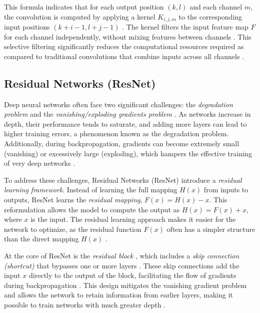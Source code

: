 This formula indicates that for each output position \( (k, l) \) and each channel \( m \), the convolution is computed by applying a kernel \( K_{i,j,m} \) to the corresponding input positions \( (k+i-1, l+j-1) \) \cite{howard2017mobilenetsefficientconvolutionalneural}. The kernel filters the input feature map \( F \) for each channel independently, without mixing features between channels \cite{howard2017mobilenetsefficientconvolutionalneural}. This selective filtering significantly reduces the computational resources required as compared to traditional convolutions that combine inputs across all channels \cite{howard2017mobilenetsefficientconvolutionalneural}.





\subsection{Residual Networks (ResNet)}
Deep neural networks often face two significant challenges: the \textit{degradation problem} and the \textit{vanishing/exploding gradients problem} \cite{he2015deepresiduallearningimage}. As networks increase in depth, their performance tends to saturate, and adding more layers can lead to higher training errors, a phenomenon known as the degradation problem. Additionally, during backpropagation, gradients can become extremely small (vanishing) or excessively large (exploding), which hampers the effective training of very deep networks \cite{he2015deepresiduallearningimage}.

To address these challenges, Residual Networks (ResNet) introduce a \textit{residual learning framework}. Instead of learning the full mapping \( H(x) \) from inputs to outputs, ResNet learns the \textit{residual mapping}, \( F(x) = H(x) - x \). This reformulation allows the model to compute the output as \( H(x) = F(x) + x \), where \( x \) is the input. The residual learning approach makes it easier for the network to optimize, as the residual function \( F(x) \) often has a simpler structure than the direct mapping \( H(x) \) \cite{he2015deepresiduallearningimage}.

At the core of ResNet is the \textit{residual block} \cite{he2015deepresiduallearningimage}, which includes a \textit{skip connection (shortcut)} that bypasses one or more layers \cite{he2015deepresiduallearningimage}. These skip connections add the input \( x \) directly to the output of the block, facilitating the flow of gradients during backpropagation \cite{he2015deepresiduallearningimage}. This design mitigates the vanishing gradient problem and allows the network to retain information from earlier layers, making it possible to train networks with much greater depth \cite{he2015deepresiduallearningimage}.

